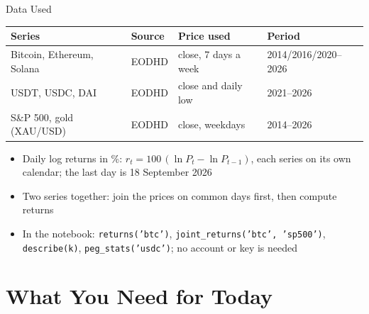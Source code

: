 \begin{frame}{Data Used}
\itemsize{\small}
\begin{center}
\footnotesize
\begin{tabular}{llll}
\toprule
\textbf{Series} & \textbf{Source} & \textbf{Price used} & \textbf{Period} \\
\midrule
Bitcoin, Ethereum, Solana & EODHD & close, 7 days a week & 2014/2016/2020--2026 \\
USDT, USDC, DAI & EODHD & close and daily low & 2021--2026 \\
S\&P 500, gold (XAU/USD) & EODHD & close, weekdays & 2014--2026 \\
\bottomrule
\end{tabular}
\end{center}
\begin{itemize}
    \item Daily log returns in \%: $r_t = 100\,(\ln P_t - \ln P_{t-1})$, each series on its own calendar; the last day is 18 September 2026
    \item Two series together: join the prices on common days first, then compute returns
    \item In the notebook: \texttt{returns('btc')}, \texttt{joint\_returns('btc', 'sp500')}, \texttt{describe(k)}, \texttt{peg\_stats('usdc')}; no account or key is needed
\end{itemize}
\end{frame}


\section{What You Need for Today}

